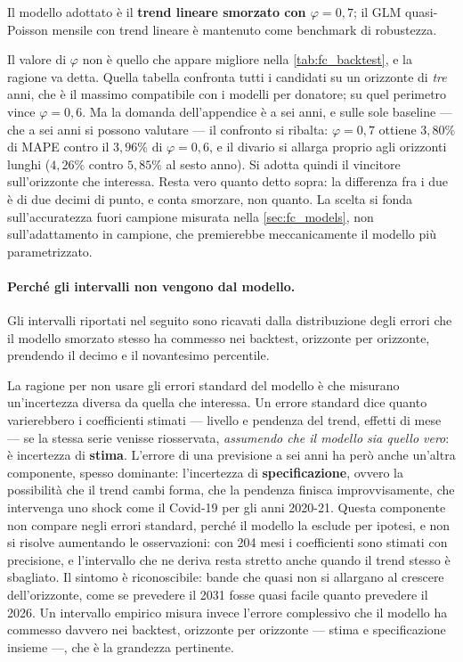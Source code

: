 Il modello adottato è il \textbf{trend lineare smorzato con
$\varphi = 0{,}7$}; il GLM quasi-Poisson mensile con trend lineare è mantenuto
come benchmark di robustezza.

Il valore di $\varphi$ non è quello che appare migliore nella
\cref{tab:fc_backtest}, e la ragione va detta. Quella tabella confronta tutti i
candidati su un orizzonte di \emph{tre} anni, che è il massimo compatibile con
i modelli per donatore; su quel perimetro vince $\varphi = 0{,}6$. Ma la
domanda dell'appendice è a sei anni, e sulle sole baseline --- che a sei anni si
possono valutare --- il confronto si ribalta: $\varphi = 0{,}7$ ottiene
$3{,}80\%$ di MAPE contro il $3{,}96\%$ di $\varphi = 0{,}6$, e il divario si
allarga proprio agli orizzonti lunghi ($4{,}26\%$ contro $5{,}85\%$ al sesto
anno). Si adotta quindi il vincitore sull'orizzonte che interessa. Resta vero
quanto detto sopra: la differenza fra i due è di due decimi di punto, e conta
smorzare, non quanto. La scelta si fonda sull'accuratezza fuori
campione misurata nella \cref{sec:fc_models}, non sull'adattamento in campione,
che premierebbe meccanicamente il modello più parametrizzato.

\paragraph{Perché gli intervalli non vengono dal modello.}
Gli intervalli riportati nel seguito sono ricavati dalla
distribuzione degli errori che il modello smorzato stesso ha commesso
nei backtest, orizzonte per orizzonte, prendendo il decimo e il novantesimo
percentile.

La ragione per non usare gli errori standard del modello è che misurano
un'incertezza diversa da quella che interessa. Un errore standard dice quanto
varierebbero i coefficienti stimati --- livello e pendenza del trend, effetti di
mese --- se la stessa serie venisse riosservata, \emph{assumendo che il modello
sia quello vero}: è incertezza di \textbf{stima}. L'errore di una previsione a
sei anni ha però anche un'altra componente, spesso dominante: l'incertezza di
\textbf{specificazione}, ovvero la possibilità che il trend cambi forma, che la
pendenza finisca improvvisamente, che intervenga uno shock come
il Covid-19 per gli anni 2020-21. Questa componente non compare negli errori standard, perché il
modello la esclude per ipotesi, e non si risolve aumentando le osservazioni: con
204 mesi i coefficienti sono stimati con precisione, e l'intervallo che ne
deriva resta stretto anche quando il trend stesso è sbagliato. Il sintomo è
riconoscibile: bande che quasi non si allargano al crescere dell'orizzonte, come
se prevedere il 2031 fosse quasi facile quanto prevedere il 2026. Un intervallo
empirico misura invece l'errore complessivo che il modello ha commesso davvero
nei backtest, orizzonte per orizzonte --- stima e specificazione insieme ---,
che è la grandezza pertinente.

